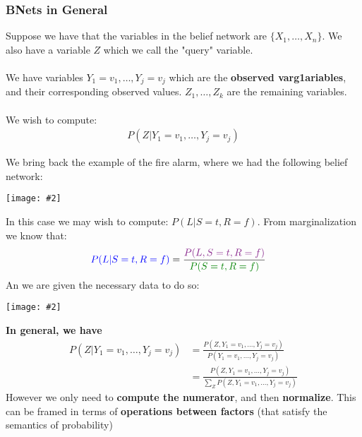 \documentclass{article}
\def\blu#1{{\color{blu}#1}}
\def\gre#1{{\color{gre}#1}}
\newcommand{\centerfig}[2]{\begin{center}\texttt{[image: \#2]}\end{center}}
\begin{document}
\subsubsection*{BNets in General}
Suppose we have that the variables in the belief network are $ \{X_1, \dots, X_n\} $. We also have a variable $ Z $ which we call the "query" variable. \\
\\
We have variables $ Y_1 = v_1, \dots, Y_j = v_j $ which are the \textbf{observed v\blu{arg1}ariables}, and their corresponding observed values. $ Z_1, \dots, Z_k $ are the remaining variables. \\
\\
We wish to compute:
\begin{align*}
P(Z | Y_1 = v_1, \dots, Y_j = v_j)
\end{align*}
\begin{siderules}
We bring back the example of the fire alarm, where we had the following belief network:
\centerfig{0.3}{BNet-2}
In this case we may wish to compute: $ P(L | S = t , R = f)$. From marginalization we know that:
\begin{align*}
 \blu{P(L | S = t , R = f)} &= \frac{\color{Fuchsia}P(L , S = t , R = f)}{\gre{P(S = t , R = f)}}
\end{align*}
An we are given the necessary data to do so:
\centerfig{0.7}{BNet-3}
\end{siderules}
\textbf{In general, we have}
\begin{align*}
P(Z | Y_1 = v_1, \dots, Y_j = v_j) &= \frac{P(Z, Y_1 = v_1, \dots, Y_j = v_j)}{P(Y_1 = v_1, \dots, Y_j = v_j)} \\
&= \frac{P(Z, Y_1 = v_1, \dots, Y_j = v_j)}{\sum_{Z}P(Z,Y_1 = v_1, \dots, Y_j = v_j)}
\end{align*}
However we only need to \textbf{compute the \blu{numerator}}, and then \textbf{normalize}. This can be framed in terms of \textbf{operations between \blu{factors}} (that satisfy the semantics of probability)
\end{document}
